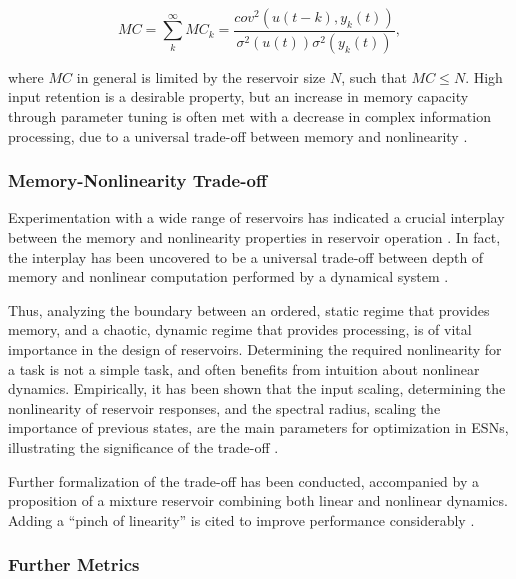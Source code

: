 \begin{equation}
  MC =
  \sum_{k}^{\infty}MC_{k} =
  \frac
  {cov^2(u(t-k), y_k(t))}
  {\sigma^{2}(u(t))\sigma^{2}(y_{k}(t))}
  ,
  \label{stm-eq}
\end{equation}

where $MC$ in general is limited by the reservoir size $N$, such that $MC \leq
N$. High input retention is a desirable property, but an increase in memory
capacity through parameter tuning is often met with a decrease in complex
information processing, due to a universal trade-off between memory and
nonlinearity \cite{dambre_information_2012}.


\subsubsection{Memory-Nonlinearity Trade-off}

Experimentation with a wide range of reservoirs has indicated a crucial
interplay between the memory and nonlinearity properties in reservoir operation
\cite{verstraeten_memory_2010}. In fact, the interplay has been uncovered to be
a universal trade-off between depth of memory and nonlinear computation
performed by a dynamical system \cite{dambre_information_2012}.

Thus, analyzing the boundary between an ordered, static regime that provides
memory, and a chaotic, dynamic regime that provides processing, is of vital
importance in the design of reservoirs. Determining the required nonlinearity
for a task is not a simple task, and often benefits from intuition about
nonlinear dynamics. Empirically, it has been shown that the input scaling,
determining the nonlinearity of reservoir responses, and the spectral radius,
scaling the importance of previous states, are the main parameters for
optimization in ESNs, illustrating the significance of the trade-off
\cite{montavon_practical_2012}.

Further formalization of the trade-off has been conducted, accompanied by a
proposition of a mixture reservoir combining both linear and nonlinear
dynamics. Adding a ``pinch of linearity'' is cited to improve performance
considerably \cite{inubushi_reservoir_2017}.

\subsubsection{Further Metrics}

